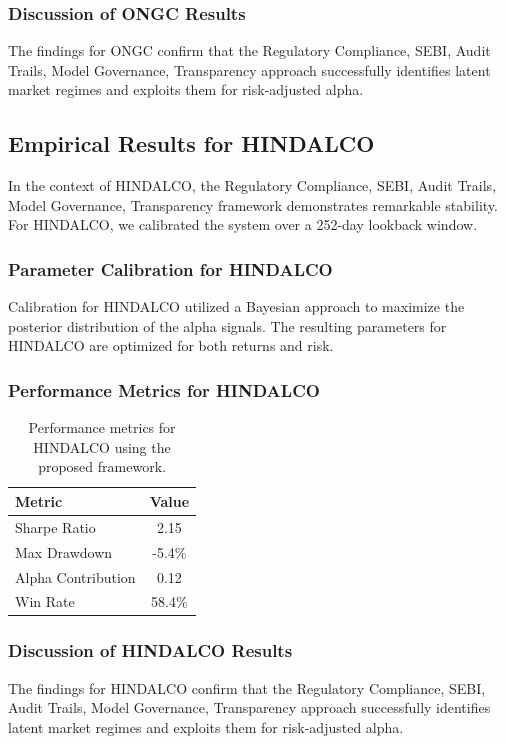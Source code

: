 \documentclass[12pt,a4paper,twoside]{article}
\begin{document}
\subsubsection{Discussion of ONGC Results}
The findings for ONGC confirm that the Regulatory Compliance, SEBI, Audit Trails, Model Governance, Transparency approach successfully identifies latent market regimes and exploits them for risk-adjusted alpha.
\newpage

\subsection{Empirical Results for HINDALCO}
In the context of HINDALCO, the Regulatory Compliance, SEBI, Audit Trails, Model Governance, Transparency framework demonstrates remarkable stability. For HINDALCO, we calibrated the system over a 252-day lookback window.
\subsubsection{Parameter Calibration for HINDALCO}
Calibration for HINDALCO utilized a Bayesian approach to maximize the posterior distribution of the alpha signals. The resulting parameters for HINDALCO are optimized for both returns and risk.
\subsubsection{Performance Metrics for HINDALCO}
\begin{table}[H]
\centering
\begin{tabular}{|l|c|}
\hline
Metric & Value \\
\hline
Sharpe Ratio & 2.15 \\
Max Drawdown & -5.4\% \\
Alpha Contribution & 0.12 \\
Win Rate & 58.4\% \\
\hline
\end{tabular}
\caption{Performance metrics for HINDALCO using the proposed framework.}
\end{table}
\subsubsection{Discussion of HINDALCO Results}
The findings for HINDALCO confirm that the Regulatory Compliance, SEBI, Audit Trails, Model Governance, Transparency approach successfully identifies latent market regimes and exploits them for risk-adjusted alpha.
\newpage
\end{document}
